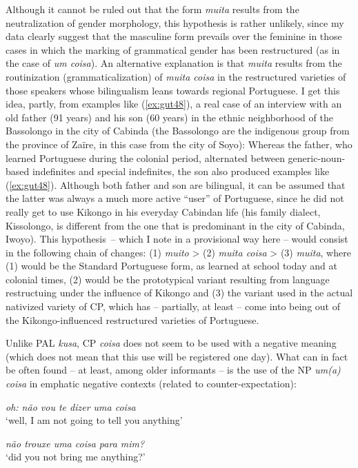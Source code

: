 \documentclass[output=paper,colorlinks,citecolor=brown]{langscibook}
\begin{document}
Although it cannot be ruled out that the form \textit{muita} results from the neutralization of gender morphology, this hypothesis is rather unlikely, since my data clearly suggest that the masculine form prevails over the feminine in those cases in which the marking of grammatical gender has been restructured (as in the case of \textit{um coisa}). An alternative explanation is that \textit{muita} results from the routinization (grammaticalization) of \textit{muita coisa} in the restructured varieties of those speakers whose bilingualism leans towards regional Portuguese. I get this idea, partly, from examples like (\ref{ex:gut48}), a real case of an interview with an old father (91 years) and his son (60 years) in the ethnic neighborhood of the Bassolongo in the city of Cabinda (the Bassolongo are the indigenous group from the province of Zaïre, in this case from the city of Soyo): Whereas the father, who learned Portuguese during the colonial period, alternated between generic-noun-based indefinites and special indefinites, the son also produced examples like (\ref{ex:gut48}). Although both father and son are bilingual, it can be assumed that the latter was always a much more active “user” of Portuguese, since he did not really get to use Kikongo in his everyday Cabindan life (his family dialect, Kissolongo, is different from the one that is predominant in the city of Cabinda, Iwoyo). This hypothesis~-- which I note in a provisional way here -- would consist in the following chain of changes: (1) \textit{muito} > (2) \textit{muita coisa} > (3) \textit{muita}, where (1) would be the Standard Portuguese form, as learned at school today and at colonial times, (2) would be the prototypical variant resulting from language restructuing under the influence of Kikongo and (3) the variant used in the actual nativized variety of CP, which has -- partially, at least -- come into being out of the Kikongo-influenced restructured varieties of Portuguese.

Unlike PAL \textit{kusa}, CP \textit{coisa} does not seem to be used with a negative meaning (which does not mean that this use will be registered one day). What can in fact be often found -- at least, among older informants -- is the use of the NP \textit{um(a) coisa} in emphatic negative contexts (related to counter-expectation):

\ea \label{ex:gut49}
    \textit{oh: não vou te dizer uma coisa}\\
    ‘well, I am not going to tell you anything’
    
    \ex \label{ex:gut50}
    \textit{não trouxe uma coisa para mim?}\\
    ‘did you not bring me anything?’
\z
\end{document}
